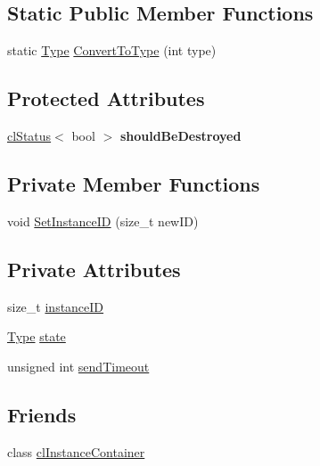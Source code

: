 \subsection*{Static Public Member Functions}
\begin{DoxyCompactItemize}
\item 
static \hyperlink{classcl_instance_core_a576bdbf2ccec2df9cb2aab1edfe9dd2e}{Type} \hyperlink{classcl_instance_core_a7912e94314b18bd6fc490bb9b629e871}{ConvertToType} (int type)
\end{DoxyCompactItemize}
\subsection*{Protected Attributes}
\begin{DoxyCompactItemize}
\item 
\hypertarget{classcl_instance_core_a48878d5b6d36775488f51113d4df8a36}{
\hyperlink{classcl_status}{clStatus}$<$ bool $>$ {\bfseries shouldBeDestroyed}}
\label{classcl_instance_core_a48878d5b6d36775488f51113d4df8a36}

\end{DoxyCompactItemize}
\subsection*{Private Member Functions}
\begin{DoxyCompactItemize}
\item 
void \hyperlink{classcl_instance_core_ab5c385b1381dbb5720e5fa8a31720935}{SetInstanceID} (size\_\-t newID)
\end{DoxyCompactItemize}
\subsection*{Private Attributes}
\begin{DoxyCompactItemize}
\item 
size\_\-t \hyperlink{classcl_instance_core_ad3de74dbad74098dc2f010806186bf7f}{instanceID}
\item 
\hyperlink{classcl_instance_core_a576bdbf2ccec2df9cb2aab1edfe9dd2e}{Type} \hyperlink{classcl_instance_core_a09705e1a816f5720469b7931d7d7fc0d}{state}
\item 
unsigned int \hyperlink{classcl_instance_core_a05be31d3ac12930f23fb1a06c25b225c}{sendTimeout}
\end{DoxyCompactItemize}
\subsection*{Friends}
\begin{DoxyCompactItemize}
\item 
class \hyperlink{classcl_instance_core_aa36ab37d58700602c2ce91068947437b}{clInstanceContainer}
\end{DoxyCompactItemize}


